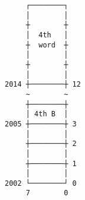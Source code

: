\documentclass[varwidth]{standalone}
\begin{document}
\begin{verbatim}
     ┌────────┐
     │        │
     ┼        ┼
     │  4th   │
     ┼  word  ┼
     │        │
     ┼        ┼
     │        │
2014 ┼────────┼ 12
     ~        ~
     ┼────────┼
     │ 4th B  │
2005 ┼────────┼ 3
     │        │
     ┼────────┼ 2
     │        │
     ┼────────┼ 1
     │        │
2002 └────────┘ 0
     7        0
\end{verbatim}
\end{document}
